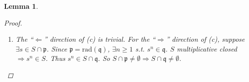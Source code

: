 \documentclass[11pt]{article}
\newtheorem{lemma}[thm]{Lemma}
\newcommand{\scp}{{\mathfrak p}}
\newcommand{\scq}{\mathfrak q}
\newcommand{\cala}{{\cal A}}
\newcommand{\Lrta}{\Longrightarrow}
\newcommand{\Llta}{\Longleftarrow}
\begin{document}
\begin{lemma}
\begin{proof}
\begin{enumerate}[label=(\alph*)]
Thus $(i)$ holds.

Proof of $(ii)$:
$$
\begin{aligned}
\left\{
\begin{aligned}
& \text{zero-divisors }\\
&\text{ in } S^{-1}\cala
\end{aligned}
\right\}
&
=\left\{
\begin{aligned}
& \frac{x}{s}:x\in\cala, s\in S\\
& \text{such that } \exists\frac{y}{t}\in S^{-1}\cala \text{ nonzero }\\
& \text{so that } \frac{x}{s}\frac{y}{t}=\frac{0}{1} 
\end{aligned}
\right\}\\
& =\left\{
\begin{aligned}
&\frac{x}{s}:\exists y\in\cala\text{ with } y\cdot t\neq 0,\forall t\in S\\
& \text{s.t. } \exists u\in S \text{ with } xuy =0\\
&\text{where } uy \neq 0
\end{aligned}
\right\}\\
\end{aligned}
$$

$$
\begin{aligned}
&=\left\{
\begin{aligned}
& \frac{x}{s}: s\in S\\
& x\in \cala \text{ is  zerodivisor}
\end{aligned}
\right\}\\
\end{aligned}
$$

$$
\begin{aligned}
&=\left\{ \frac{x}{s}: s\in S, x\in \cala\text{ is nilpotent}\right\}((0)\subseteq \cala\text{ is primary})\\
&=S^{-1}(\text{Nil}(\cala))\\
&=\text{Nil}(  S^{-1}\cala),\\
&(\text{ by the fact that radical commutes with localizations})
\end{aligned}
$$
Thus \{zero-divisors in $S^{-1}\cala$\}=$\text{Nil}(  S^{-1}\cala)$, so $(0)_{S^{-1}\cala}$ is primary.

\item The ``$\Llta$'' direction of (c) is trivial. For the ``$\Lrta$'' direction of (c), suppose $\exists s\in S\cap\scp$. Since $\scp=\text{rad}(\scq)$, $\exists n\geq 1 $ s.t. $s^n\in \scq$. $S$ multiplicative closed $\Lrta s^n\in S$. Thus $s^n\in S\cap \scq$. So $S\cap \scp\neq \emptyset \Lrta S\cap\scq\neq \emptyset$.
\end{enumerate}
\end{proof}
\end{lemma}
\end{document}
